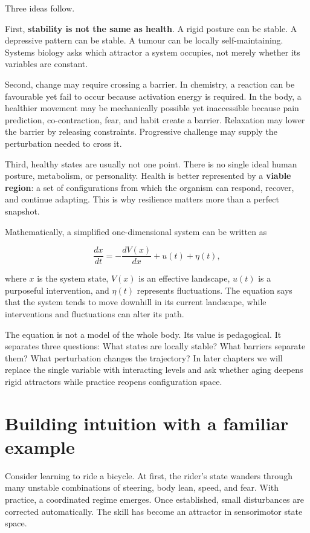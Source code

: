 Three ideas follow.

First, \textbf{stability is not the same as health}. A rigid posture can be stable. A depressive pattern can be stable. A tumour can be locally self-maintaining. Systems biology asks which attractor a system occupies, not merely whether its variables are constant.

Second, change may require crossing a barrier. In chemistry, a reaction can be favourable yet fail to occur because activation energy is required. In the body, a healthier movement may be mechanically possible yet inaccessible because pain prediction, co-contraction, fear, and habit create a barrier. Relaxation may lower the barrier by releasing constraints. Progressive challenge may supply the perturbation needed to cross it.

Third, healthy states are usually not one point. There is no single ideal human posture, metabolism, or personality. Health is better represented by a \textbf{viable region}: a set of configurations from which the organism can respond, recover, and continue adapting. This is why resilience matters more than a perfect snapshot.

Mathematically, a simplified one-dimensional system can be written as

\[
\frac{dx}{dt}=-\frac{dV(x)}{dx}+u(t)+\eta(t),
\]

where \(x\) is the system state, \(V(x)\) is an effective landscape, \(u(t)\) is a purposeful intervention, and \(\eta(t)\) represents fluctuations. The equation says that the system tends to move downhill in its current landscape, while interventions and fluctuations can alter its path.

The equation is not a model of the whole body. Its value is pedagogical. It separates three questions: What states are locally stable? What barriers separate them? What perturbation changes the trajectory? In later chapters we will replace the single variable with interacting levels and ask whether aging deepens rigid attractors while practice reopens configuration space.

\section{Building intuition with a familiar example}\label{building-intuition-with-a-familiar-example}

Consider learning to ride a bicycle. At first, the rider's state wanders through many unstable combinations of steering, body lean, speed, and fear. With practice, a coordinated regime emerges. Once established, small disturbances are corrected automatically. The skill has become an attractor in sensorimotor state space.

